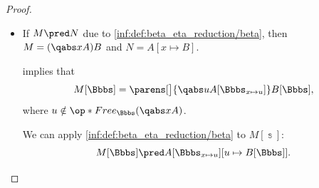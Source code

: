 \begin{proof}
\begin{itemize}
    By assumption, \( u \) is not in \( \op*{Free}_\Bbbs(M) \), hence it belongs to \( \op*{Free}_\Bbbs(A) \) only if it is free in \( \Bbbs(x) \). The generalized condition in \cref{thm:lambda_substitution_chain_contraction/composition} is satisfied, so we conclude that
    \begin{equation*}
      A[\Bbbs_{x \mapsto u}][u \mapsto v] \aequiv A[\Bbbs_{x \mapsto v}].
    \end{equation*}

    Therefore,
    \begin{equation}\label{eq:thm:substitution_on_single_step_reduction/proof/abs/alpha}
      M[\Bbbs] \aequiv \qabs v A[\Bbbs_{x \mapsto v}].
    \end{equation}

    The inductive hypothesis implies that
    \begin{equation*}
      A[\Bbbs_{x \mapsto v}] \pred B[\Bbbs_{x \mapsto v}],
    \end{equation*}
    hence, we can apply \ref{inf:def:lambda_term_reduction/abs} to conclude that
    \begin{equation}\label{eq:thm:substitution_on_single_step_reduction/proof/abs/hyp}
      \qabs v A[\Bbbs_{x \mapsto v}] \pred \qabs v B[\Bbbs_{x \mapsto v}].
    \end{equation}

    Finally, by noting \eqref{eq:thm:substitution_on_single_step_reduction/proof/abs/alpha}, we can apply \ref{inf:def:lambda_term_reduction/alpha} to conclude that
    \begin{equation*}
      M[\Bbbs]
      =
      \qabs u A[\Bbbs_{x \mapsto u}]
      \pred
      \qabs v B[\Bbbs_{x \mapsto v}]
      =
      N[\Bbbs].
    \end{equation*}

    \item If \( M \pred N \) due to \ref{inf:def:beta_eta_reduction/beta}, then \( M = (\qabs x A)B \) and \( N = A[x \mapsto B] \).

     implies that
    \begin{equation*}
      M[\Bbbs] = \parens[\big]{ \qabs u A[\Bbbs_{x \mapsto u}] } B[\Bbbs],
    \end{equation*}
    where \( u \notin \op*{Free}_\Bbbs(\qabs x A) \).

    We can apply \ref{inf:def:beta_eta_reduction/beta} to \( M[\Bbbs] \):
    \begin{equation*}
      M[\Bbbs]
      \pred
      A[\Bbbs_{x \mapsto u}][u \mapsto B[\Bbbs]].
    \end{equation*}


\end{itemize}
\end{proof}
